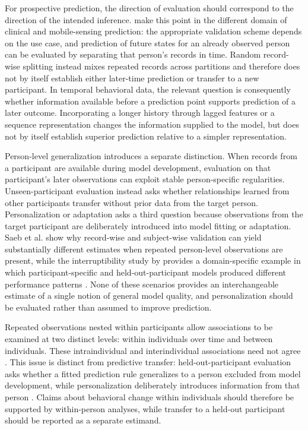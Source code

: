 For prospective prediction, the direction of evaluation should correspond to the direction of the intended inference. \textcite{saeb2017useCase} make this point in the different domain of clinical and mobile-sensing prediction: the appropriate validation scheme depends on the use case, and prediction of future states for an already observed person can be evaluated by separating that person's records in time. Random record-wise splitting instead mixes repeated records across partitions and therefore does not by itself establish either later-time prediction or transfer to a new participant. In temporal behavioral data, the relevant question is consequently whether information available before a prediction point supports prediction of a later outcome. Incorporating a longer history through lagged features or a sequence representation changes the information supplied to the model, but does not by itself establish superior prediction relative to a simpler representation.

Person-level generalization introduces a separate distinction. When records from a participant are available during model development, evaluation on that participant's later observations can exploit stable person-specific regularities. Unseen-participant evaluation instead asks whether relationships learned from other participants transfer without prior data from the target person. Personalization or adaptation asks a third question because observations from the target participant are deliberately introduced into model fitting or adaptation. Saeb et al. show why record-wise and subject-wise validation can yield substantially different estimates when repeated person-level observations are present, while the interruptibility study by \textcite{zueger2018sensing} provides a domain-specific example in which participant-specific and held-out-participant models produced different performance patterns \parencite{saeb2017useCase}. None of these scenarios provides an interchangeable estimate of a single notion of general model quality, and personalization should be evaluated rather than assumed to improve prediction.

Repeated observations nested within participants allow associations to be examined at two distinct levels: within individuals over time and between individuals. These intraindividual and interindividual associations need not agree \parencite{fisher2018groupIndividual}. This issue is distinct from predictive transfer: held-out-participant evaluation asks whether a fitted prediction rule generalizes to a person excluded from model development, while personalization deliberately introduces information from that person \parencite{saeb2017useCase,zueger2018sensing}. Claims about behavioral change within individuals should therefore be supported by within-person analyses, while transfer to a held-out participant should be reported as a separate estimand.


